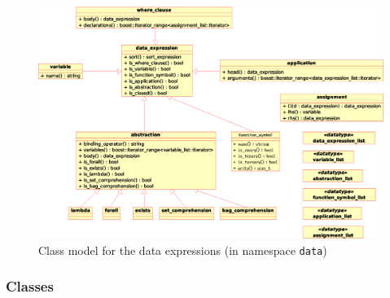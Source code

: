 \documentclass[a4paper,11pt]{article}
\begin{document}
\begin{figure}[htp]
    \begin{center}
      \includegraphics[width=\textwidth]{data_expr}
      \caption{Class model for the data expressions (in namespace \texttt{data})}
      \label{fig:class_data expressions}
    \end{center}
  \end{figure}

\subsubsection{Classes}
\end{document}
